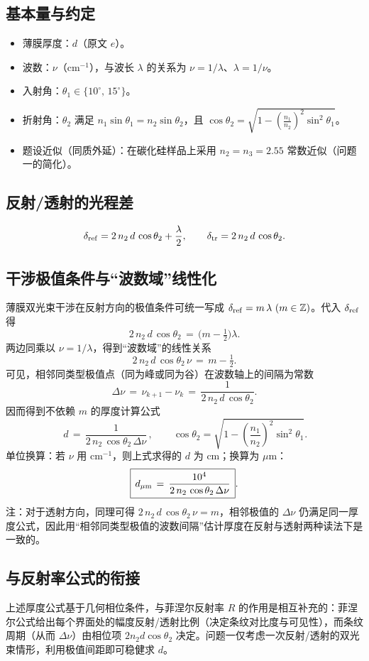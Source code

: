 \documentclass{ctexart}
\begin{document}
\subsection{基本量与约定}
\begin{itemize}
    \item 薄膜厚度：\(d\)（原文 \(e\)）。
    \item 波数：\(\nu\)（cm\(^{-1}\)），与波长 \(\lambda\) 的关系为 \(\nu=1/\lambda\)、\(\lambda=1/\nu\)。
    \item 入射角：\(\theta_1\in\{10^\circ,\,15^\circ\}\)。
    \item 折射角：\(\theta_2\) 满足 \(n_1\sin\theta_1=n_2\sin\theta_2\)，且 \(\cos\theta_2=\sqrt{1-(\tfrac{n_1}{n_2})^2\sin^2\theta_1}\)。
    \item 题设近似（同质外延）：在碳化硅样品上采用 \(n_2=n_3=2.55\) 常数近似（问题一的简化）。
\end{itemize}
\subsection{反射/透射的光程差}
\[
    \delta_{\rm ref}=2\,n_2\,d\,\cos\theta_2+\frac{\lambda}{2},\qquad
    \delta_{\rm tr}=2\,n_2\,d\,\cos\theta_2.
\]
\subsection{干涉极值条件与“波数域”线性化}
薄膜双光束干涉在反射方向的极值条件可统一写成 \(\delta_{\rm ref}=m\,\lambda\ (m\in\mathbb{Z})\)。代入 \(\delta_{\rm ref}\) 得
\[
    2\,n_2\,d\,\cos\theta_2 \,=\, \Big(m-\tfrac{1}{2}\Big)\lambda.
\]
两边同乘以 \(\nu=1/\lambda\)，得到“波数域”的线性关系
\[
    2\,n_2\,d\,\cos\theta_2\,\nu \,=\, m-\tfrac{1}{2}.
\]
可见，相邻同类型极值点（同为峰或同为谷）在波数轴上的间隔为常数
\[
    \Delta \nu \,=\, \nu_{k+1}-\nu_k \,=\, \frac{1}{2\,n_2\,d\,\cos\theta_2}.
\]
因而得到不依赖 \(m\) 的厚度计算公式
\[
    \boxed{\,d \,=\, \frac{1}{2\,n_2\,\cos\theta_2\,\Delta \nu}\,},\qquad
    \cos\theta_2=\sqrt{1-\left(\frac{n_1}{n_2}\right)^2\sin^2\theta_1}.
\]
单位换算：若 \(\nu\) 用 cm\(^{-1}\)，则上式求得的 \(d\) 为 cm；换算为 \(\mu\)m：
\[
    \boxed{\,d_{\mu{\rm m}} \,=\, \frac{10^4}{2\,n_2\,\cos\theta_2\,\Delta \nu}\,}.
\]
注：对于透射方向，同理可得 \(2\,n_2\,d\,\cos\theta_2\,\nu=m\)，相邻极值的 \(\Delta\nu\) 仍满足同一厚度公式，因此用“相邻同类型极值的波数间隔”估计厚度在反射与透射两种读法下是一致的。

\subsection{与反射率公式的衔接}
上述厚度公式基于几何相位条件，与菲涅尔反射率 \(R\) 的作用是相互补充的：菲涅尔公式给出每个界面处的幅度反射/透射比例（决定条纹对比度与可见性），而条纹周期（从而 \(\Delta\nu\)）由相位项 \(2n_2 d \cos\theta_2\) 决定。问题一仅考虑一次反射/透射的双光束情形，利用极值间距即可稳健求 \(d\)。
\end{document}
